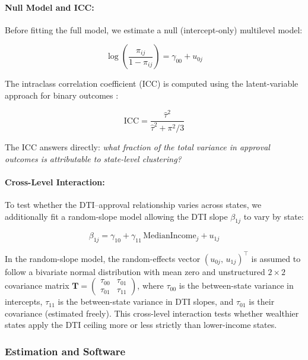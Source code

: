 \documentclass[12pt,letterpaper]{article}
\begin{document}
\paragraph{Null Model and ICC:}
Before fitting the full model, we estimate a null (intercept-only) multilevel model:

\begin{equation}
  \log\!\left(\frac{\pi_{ij}}{1-\pi_{ij}}\right) = \gamma_{00} + u_{0j}
  \label{eq:null}
\end{equation}

The intraclass correlation coefficient (ICC) is computed using the latent-variable approach
for binary outcomes \citep{snijders1999}:

\begin{equation}
  \text{ICC} = \frac{\hat{\tau}^2}{\hat{\tau}^2 + \pi^2/3}
  \label{eq:icc}
\end{equation}

The ICC answers directly: \emph{what fraction of the total variance in approval outcomes is
attributable to state-level clustering?}

\paragraph{Cross-Level Interaction:}
To test whether the DTI--approval relationship varies across states, we additionally fit a
random-slope model allowing the DTI slope $\beta_{1j}$ to vary by state:

\begin{equation}
  \beta_{1j} = \gamma_{10} + \gamma_{11}\,\text{MedianIncome}_{j} + u_{1j}
  \label{eq:slope}
\end{equation}

In the random-slope model, the random-effects vector $(u_{0j},\, u_{1j})^{\top}$ is assumed
to follow a bivariate normal distribution with mean zero and unstructured $2 \times 2$
covariance matrix
$\mathbf{T} = \begin{pmatrix} \tau_{00} & \tau_{01} \\ \tau_{01} & \tau_{11} \end{pmatrix}$,
where $\tau_{00}$ is the between-state variance in intercepts, $\tau_{11}$ is the
between-state variance in DTI slopes, and $\tau_{01}$ is their covariance (estimated freely).
This cross-level interaction tests whether wealthier states apply the DTI ceiling more or
less strictly than lower-income states.

\subsubsection{Estimation and Software}
\end{document}
